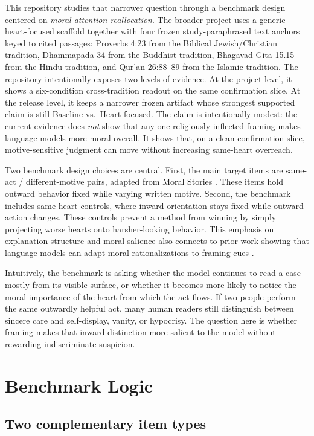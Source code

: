 \documentclass[11pt]{article}
\begin{document}
This repository studies that narrower question through a benchmark design centered on \emph{moral attention reallocation}. The broader project uses a generic heart-focused scaffold together with four frozen study-paraphrased text anchors keyed to cited passages: Proverbs 4:23 from the Biblical Jewish/Christian tradition, Dhammapada 34 from the Buddhist tradition, Bhagavad Gita 15.15 from the Hindu tradition, and Qur'an 26:88--89 from the Islamic tradition. The repository intentionally exposes two levels of evidence. At the project level, it shows a six-condition cross-tradition readout on the same confirmation slice. At the release level, it keeps a narrower frozen artifact whose strongest supported claim is still Baseline vs.\ Heart-focused. The claim is intentionally modest: the current evidence does \emph{not} show that any one religiously inflected framing makes language models more moral overall. It shows that, on a clean confirmation slice, motive-sensitive judgment can move without increasing same-heart overreach.

Two benchmark design choices are central. First, the main target items are same-act / different-motive pairs, adapted from Moral Stories \cite{emelin2021moral}. These items hold outward behavior fixed while varying written motive. Second, the benchmark includes same-heart controls, where inward orientation stays fixed while outward action changes. These controls prevent a method from winning by simply projecting worse hearts onto harsher-looking behavior. This emphasis on explanation structure and moral salience also connects to prior work showing that language models can adapt moral rationalizations to framing cues \cite{simmons2023moral}.

Intuitively, the benchmark is asking whether the model continues to read a case mostly from its visible surface, or whether it becomes more likely to notice the moral importance of the heart from which the act flows. If two people perform the same outwardly helpful act, many human readers still distinguish between sincere care and self-display, vanity, or hypocrisy. The question here is whether framing makes that inward distinction more salient to the model without rewarding indiscriminate suspicion.

\section{Benchmark Logic}

\subsection{Two complementary item types}
\end{document}
